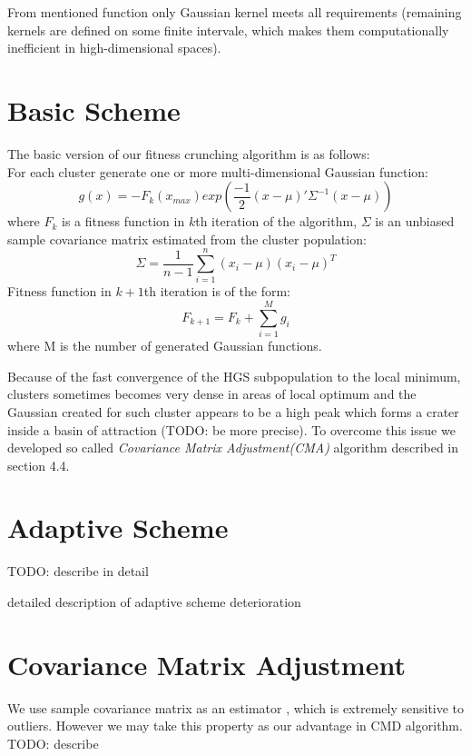 From mentioned function only Gaussian kernel meets all requirements (remaining
kernels are defined on some finite intervale, which makes them computationally
inefficient in high-dimensional spaces).

\section{Basic Scheme}
The basic version of our fitness crunching algorithm is as follows: \\
For each cluster generate one or more multi-dimensional Gaussian function:
\begin{equation}
 g(x)= - F_k(x_{max}) exp(\frac{-1}{2}(x-\mu)'\Sigma^{-1}(x - \mu))
\end{equation}
where $F_k$ is a fitness function in $k$th iteration of the algorithm,
$\Sigma$ is an unbiased sample covariance matrix \cite{covariance} estimated
from the cluster population:
\begin{equation}
 \Sigma = \frac{1}{n-1}\sum_{i=1}^n(x_i - \mu)(x_i - \mu)^T
\end{equation}
Fitness function in $k+1$th iteration is of the form:
\begin{equation}
 F_{k+1}=F_k + \sum_{i=1}^M g_i
\end{equation}
where M is the number of generated Gaussian functions.

Because of the fast convergence of the HGS subpopulation to the local minimum,
clusters sometimes becomes very dense in areas of local optimum and the Gaussian
created for such cluster appears to be a high peak which forms a crater inside 
a basin of attraction (TODO: be more precise). To overcome this issue we
developed so called \textit{Covariance Matrix Adjustment(CMA)} algorithm
described in section 4.4.


\section{Adaptive Scheme}
TODO: describe in detail

detailed description of adaptive scheme deterioration

\section{Covariance Matrix Adjustment}
We use sample covariance matrix as an estimator \cite{covariance}, which is 
extremely sensitive to outliers. However we may take this property as our
advantage in CMD algorithm. TODO: describe


